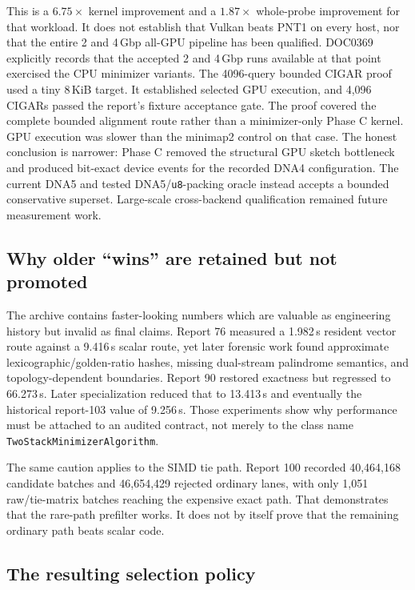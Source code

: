This is a $6.75\times$ kernel improvement and a $1.87\times$ whole-probe
improvement for that workload.  It does not establish that Vulkan beats PNT1
on every host, nor that the entire 2 and 4\,Gbp all-GPU pipeline has been
qualified. DOC0369 explicitly records that the accepted 2 and 4\,Gbp runs
available at that point exercised the CPU minimizer variants. The 4096-query
bounded CIGAR proof used a tiny 8\,KiB target. It established selected GPU
execution, and 4,096 CIGARs passed the report's fixture acceptance gate.  The
proof covered the complete bounded alignment route rather than a minimizer-only Phase C kernel. GPU
execution was slower than the minimap2 control on that case.
The honest conclusion is narrower: Phase C removed the structural GPU sketch
bottleneck and produced bit-exact device events for the recorded DNA4
configuration. The current DNA5 and tested DNA5/\texttt{u8}-packing oracle instead
accepts a bounded conservative superset. Large-scale cross-backend
qualification remained future measurement work.

\subsection{Why older ``wins'' are retained but not promoted}

The archive contains faster-looking numbers which are valuable as engineering
history but invalid as final claims.  Report 76 measured a 1.982\,s resident
vector route against a 9.416\,s scalar route, yet later forensic work found
approximate lexicographic/golden-ratio hashes, missing dual-stream palindrome
semantics, and topology-dependent boundaries.  Report 90 restored exactness
but regressed to 66.273\,s. Later specialization reduced that to 13.413\,s and
eventually the historical report-103 value of 9.256\,s. Those experiments show
why performance must be attached to an audited contract, not merely to the class name
\texttt{TwoStackMinimizer}\allowbreak\texttt{Algorithm}.

The same caution applies to the SIMD tie path. Report 100 recorded
40,464,168 candidate batches and 46,654,429 rejected ordinary lanes, with only
1,051 raw/tie-matrix batches reaching the expensive exact path. That
demonstrates that the rare-path prefilter works. It does not by itself prove
that the remaining ordinary path beats scalar code.

\subsection{The resulting selection policy}
\label{sec:minimizer-selection}

